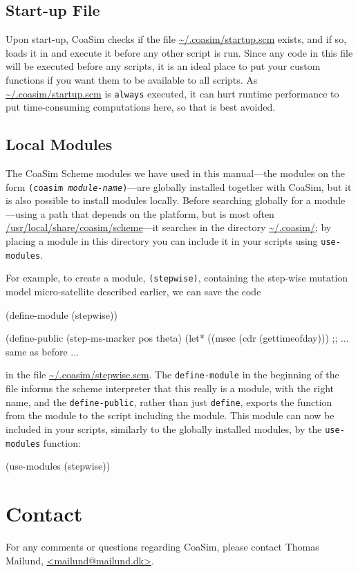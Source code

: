 \documentclass{manual}
\begin{document}
\subsection{Start-up File}
\label{sec:start-up-file}

Upon start-up, CoaSim checks if the file \url{~/.coasim/startup.scm}
exists, and if so, loads it in and execute it before any other script
is run.  Since any code in this file will be executed before any
scripts, it is an ideal place to put your custom functions if you want
them to be available to all scripts.  As \url{~/.coasim/startup.scm}
is \texttt{always} executed, it can hurt runtime performance to put
time-consuming computations here, so that is best avoided.


\subsection{Local Modules}
\label{sec:local-modules}

The CoaSim Scheme modules we have used in this manual---the modules on
the form \texttt{(coasim \emph{module-name})}---are globally installed
together with CoaSim, but it is also possible to install modules
locally.  Before searching globally for a module---using a path that
depends on the platform, but is most often
\url{/usr/local/share/coasim/scheme}---it searches in the directory
\url{~/.coasim/}; by placing a module in this directory you can
include it in your scripts using \texttt{use-modules}.

For example, to create a module, \texttt{(stepwise)}, containing the
step-wise mutation model micro-satellite described earlier, we can
save the code
\begin{code}
(define-module (stepwise))

(define-public (step-ms-marker pos theta)
  (let* ((msec (cdr (gettimeofday)))
  ;; ... same as before ...
\end{code}
in the file \url{~/.coasim/stepwise.scm}.  The \texttt{define-module}
in the beginning of the file informs the scheme interpreter that this
really is a module, with the right name, and the
\texttt{define-public}, rather than just \texttt{define}, exports the
function from the module to the script including the module.  This
module can now be included in your scripts, similarly to the globally
installed modules, by the \texttt{use-modules} function:
\begin{code}
(use-modules (stepwise))
\end{code}


\section{Contact}
\label{sec:contact}

For any comments or questions regarding CoaSim, please contact Thomas
Mailund, \url{<mailund@mailund.dk>}.
\end{document}
